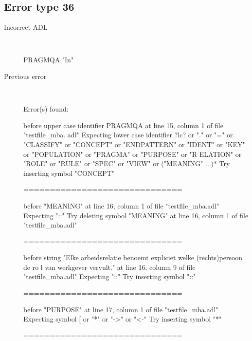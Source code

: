 \hrulefill

\subsection{Error type 36}
  \begin{description}
  \item[Incorrect ADL]~\\
\begin{adl}
PRAGMQA "In"\end{adl}
  \item[Previous error]~\\
\begin{haskell}
Error(s) found:

before upper case identifier PRAGMQA at line 15, column 1 of file "testfile_mba.
adl"
Expecting lower case identifier ?lc? or "." or "=" or "CLASSIFY" or "CONCEPT" or
 "ENDPATTERN" or "IDENT" or "KEY" or "POPULATION" or "PRAGMA" or "PURPOSE" or "R
ELATION" or "ROLE" or "RULE" or "SPEC" or "VIEW" or ("MEANING" ...)*
Try inserting symbol "CONCEPT"

==============================

before "MEANING" at line 16, column 1 of file "testfile_mba.adl"
Expecting "::"
Try deleting symbol "MEANING" at line 16, column 1 of file "testfile_mba.adl"

==============================

before string "Elke arbeidsrelatie benoemt expliciet welke (rechts)persoon de ro
l van werkgever vervult." at line 16, column 9 of file "testfile_mba.adl"
Expecting "::"
Try inserting symbol "::"

==============================

before "PURPOSE" at line 17, column 1 of file "testfile_mba.adl"
Expecting symbol [ or "*" or "->" or "<-"
Try inserting symbol "*"

==============================


\end{haskell}
\end{description}
